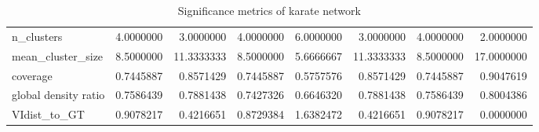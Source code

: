 \begin{table}[ht]
\begin{tabular}{lrrrrrrr}
  n\_clusters & 4.0000000 & 3.0000000 & 4.0000000 & 6.0000000 & 3.0000000 & 4.0000000 & 2.0000000 \\ 
  mean\_cluster\_size & 8.5000000 & 11.3333333 & 8.5000000 & 5.6666667 & 11.3333333 & 8.5000000 & 17.0000000 \\ 
  coverage & 0.7445887 & 0.8571429 & 0.7445887 & 0.5757576 & 0.8571429 & 0.7445887 & 0.9047619 \\ 
  global density ratio & 0.7586439 & 0.7881438 & 0.7427326 & 0.6646320 & 0.7881438 & 0.7586439 & 0.8004386 \\ 
  VIdist\_to\_GT & 0.9078217 & 0.4216651 & 0.8729384 & 1.6382472 & 0.4216651 & 0.9078217 & 0.0000000 \\ 
   \hline
\end{tabular}
\caption{Significance metrics of karate network}
\label{tab:sig_karate}
\end{table}
